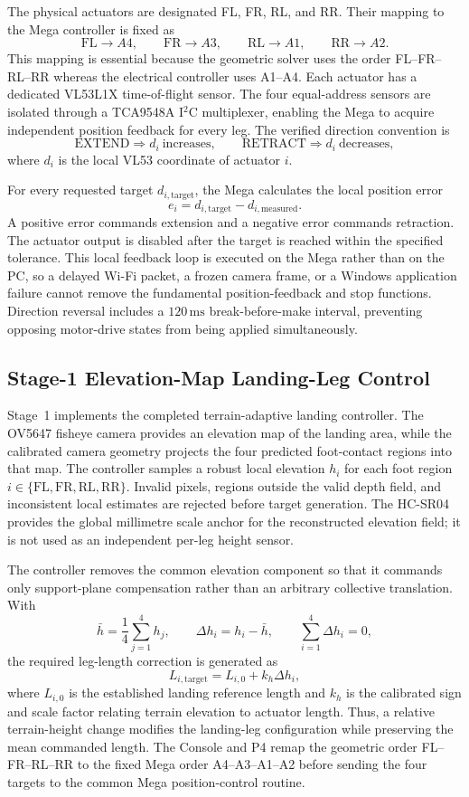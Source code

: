 The physical actuators are designated FL, FR, RL, and RR. Their mapping to the Mega controller is fixed as
\[
\mathrm{FL}\rightarrow A4,\qquad
\mathrm{FR}\rightarrow A3,\qquad
\mathrm{RL}\rightarrow A1,\qquad
\mathrm{RR}\rightarrow A2.
\]
This mapping is essential because the geometric solver uses the order FL--FR--RL--RR whereas the electrical controller uses A1--A4. Each actuator has a dedicated VL53L1X time-of-flight sensor. The four equal-address sensors are isolated through a TCA9548A I$^2$C multiplexer, enabling the Mega to acquire independent position feedback for every leg. The verified direction convention is
\[
\text{EXTEND}\Rightarrow d_i\ \text{increases},
\qquad
\text{RETRACT}\Rightarrow d_i\ \text{decreases},
\]
where $d_i$ is the local VL53 coordinate of actuator $i$.

For every requested target $d_{i,\mathrm{target}}$, the Mega calculates the local position error
\[
e_i=d_{i,\mathrm{target}}-d_{i,\mathrm{measured}}.
\]
A positive error commands extension and a negative error commands retraction. The actuator output is disabled after the target is reached within the specified tolerance. This local feedback loop is executed on the Mega rather than on the PC, so a delayed Wi-Fi packet, a frozen camera frame, or a Windows application failure cannot remove the fundamental position-feedback and stop functions. Direction reversal includes a $120\,\mathrm{ms}$ break-before-make interval, preventing opposing motor-drive states from being applied simultaneously.

\subsection*{Stage-1 Elevation-Map Landing-Leg Control}

Stage~1 implements the completed terrain-adaptive landing controller. The OV5647 fisheye camera provides an elevation map of the landing area, while the calibrated camera geometry projects the four predicted foot-contact regions into that map. The controller samples a robust local elevation $h_i$ for each foot region $i\in\{\mathrm{FL},\mathrm{FR},\mathrm{RL},\mathrm{RR}\}$. Invalid pixels, regions outside the valid depth field, and inconsistent local estimates are rejected before target generation. The HC-SR04 provides the global millimetre scale anchor for the reconstructed elevation field; it is not used as an independent per-leg height sensor.

The controller removes the common elevation component so that it commands only support-plane compensation rather than an arbitrary collective translation. With
\[
\bar h=\frac{1}{4}\sum_{j=1}^{4}h_j,
\qquad
\Delta h_i=h_i-\bar h,
\qquad
\sum_{i=1}^{4}\Delta h_i=0,
\]
the required leg-length correction is generated as
\[
L_{i,\mathrm{target}}=L_{i,0}+k_h\Delta h_i,
\]
where $L_{i,0}$ is the established landing reference length and $k_h$ is the calibrated sign and scale factor relating terrain elevation to actuator length. Thus, a relative terrain-height change modifies the landing-leg configuration while preserving the mean commanded length. The Console and P4 remap the geometric order FL--FR--RL--RR to the fixed Mega order A4--A3--A1--A2 before sending the four targets to the common Mega position-control routine.

